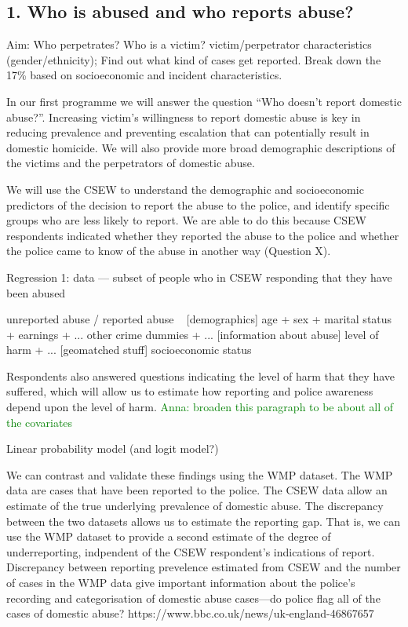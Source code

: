 \documentclass[11pt, a4paper]{article}
\newcommand{\NS}[1] {{\textcolor{green}{#1}}}
\begin{document}
\subsection*{1. Who is abused and who reports abuse?}

Aim: Who perpetrates? Who is a victim? victim/perpetrator characteristics (gender/ethnicity); Find out what kind of cases get reported. Break down the 17\% based on socioeconomic and incident characteristics.

In our first programme we will answer the question ``Who doesn't report domestic abuse?''. Increasing victim's willingness to report domestic abuse is key in reducing prevalence and preventing escalation that can potentially result in domestic homicide. We will also provide more broad demographic descriptions of the victims and the perpetrators of domestic abuse.  

We will use the CSEW to understand the demographic and socioeconomic predictors of the decision to report the abuse to the police, and identify specific groups who are less likely to report. We are able to do this because CSEW respondents indicated whether they reported the abuse to the police  and whether the police came to know of the abuse in another way (Question X). 

Regression 1: data --- subset of people who in CSEW responding that they have been abused

	unreported abuse / reported abuse ~ 
	[demographics] age + sex + marital status + earnings + ... 
	other crime dummies + ...
	[information about abuse] level of harm + ...
	[geomatched stuff] socioeconomic status
	

Respondents also answered questions indicating the level of harm that they have suffered, which will allow us to estimate how reporting and police awareness depend upon the level of harm. \NS{Anna: broaden this paragraph to be about all of the covariates}

Linear probability model (and logit model?)

We can contrast and validate these findings using the WMP dataset. 
The WMP data are cases that have been reported to the police. The CSEW data allow an estimate of the true underlying prevalence of domestic abuse. The discrepancy between the two datasets allows us to estimate the reporting gap. 
That is, we can use the WMP dataset to provide a second estimate of the degree of underreporting, indpendent of the CSEW respondent's indications of report. Discrepancy between reporting prevelence estimated from CSEW and the number of cases in the WMP data give important information about the police's recording and categorisation of domestic abuse cases---do police flag all of the cases of domestic abuse?  https://www.bbc.co.uk/news/uk-england-46867657
\end{document}
